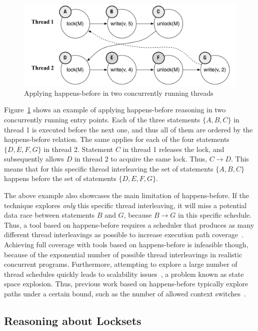 \begin{figure}[htbp]
\centering
\includegraphics[width=1\linewidth]{img/happens_before.pdf}
\caption{Applying happens-before in two concurrently running threads}
\label{fig:happens_before}
\end{figure}

Figure~\ref{fig:happens_before} shows an example of applying happens-before reasoning in two concurrently running entry points. Each of the three statements $\{A, B, C\}$ in thread 1 is executed before the next one, and thus all of them are ordered by the happens-before relation. The same applies for each of the four statements $\{D, E, F, G\}$ in thread 2. Statement $C$ in thread 1 releases the lock, and subsequently allows $D$ in thread 2 to acquire the same lock. Thus, $C \rightarrow D$. This means that for this specific thread interleaving the set of statements $\{A, B, C\}$ happens before the set of statements $\{D, E, F, G\}$.

The above example also showcases the main limitation of happens-before. If the technique explores \emph{only} this specific thread interleaving, it will miss a potential data race between statements $B$ and $G$, because $B \rightarrow G$ in this specific schedule. Thus, a tool based on happens-before requires a scheduler that produces as many different thread interleavings as possible to increase execution path coverage~\cite{savage1997eraser}. Achieving full coverage with tools based on happens-before is infeasible though, because of the exponential number of possible thread interleavings in realistic concurrent programs. Furthermore, attempting to explore a large number of thread schedules quickly leads to scalability issues~\cite{musuvathi2008finding}, a problem known as state space explosion. Thus, previous work based on happens-before typically explore paths under a certain bound, such as the number of allowed context switches~\cite{qadeer2004kiss}.

\subsection{Reasoning about Locksets}
\label{bg:lockset}

